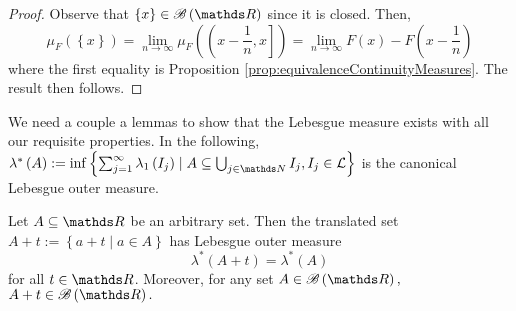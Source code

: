 \begin{proof}
Observe that $\left\{ x\right\} \in\borel\left(\R\right)$ since it
is closed. Then,
\[
\mu_{F}\left(\left\{ x\right\} \right)=\lim_{n\to\infty}\mu_{F}\left(\left(x-\frac{1}{n},x\right]\right)=\lim_{n\to\infty}F\left(x\right)-F\left(x-\frac{1}{n}\right)
\]
where the first equality is Proposition \ref{prop:equivalenceContinuityMeasures}.
The result then follows.
\end{proof}
We need a couple a lemmas to show that the Lebesgue measure exists
with all our requisite properties. In the following, $\lambda^{*}\left(A\right):=\inf\left\{ \sum_{j=1}^{\infty}\lambda_{1}\left(I_{j}\right)\mid A\subseteq\bigcup_{j\in\N}I_{j},I_{j}\in\mathcal{L}\right\} $
is the canonical Lebesgue outer measure.
\begin{lem}
\label{lem:outerMeasureTranslationInvariant}Let $A\subseteq\R$ be
an arbitrary set. Then the translated set $A+t:=\left\{ a+t\mid a\in A\right\} $
has Lebesgue outer measure
\[
\lambda^{*}\left(A+t\right)=\lambda^{*}\left(A\right)
\]
for all $t\in\R$. Moreover, for any set $A\in\borel\left(\R\right),$$A+t\in\borel\left(\R\right).$
\end{lem}

